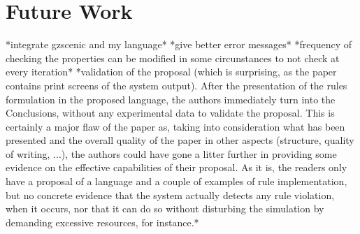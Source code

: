 \chapter{Future Work}
\label{chap:futurework}

*integrate gzscenic and my language*
*give better error messages*
*frequency of checking the properties can be modified in some circunstances to not check at every iteration*
*validation of the proposal (which is surprising, as the paper contains print screens of the system output). After the presentation of the rules formulation in the proposed language, the authors immediately turn into the Conclusions, without any experimental data to validate the proposal. This is certainly a major flaw of the paper as, taking into consideration what has been presented and the overall quality of the paper in other aspects (structure, quality of writing, ...), the authors could have gone a litter further in providing some evidence on the effective capabilities of their proposal. As it is, the readers only have a proposal of a language and a couple of examples of rule implementation, but no concrete evidence that the system actually detects any rule violation, when it occurs, nor that it can do so without disturbing the simulation by demanding excessive resources, for instance.*